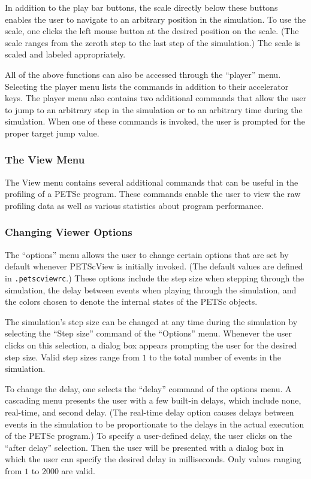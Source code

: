 {In addition to the play bar buttons, the scale directly below these
buttons enables the user to navigate to an arbitrary position in the
simulation.  To use the scale, one clicks the left mouse button at
the desired position on the scale.  (The scale ranges from the zeroth
step to the last step of the simulation.)  The scale is scaled and
labeled appropriately.

All of the above functions can also be accessed through the ``player''
menu.  Selecting the player menu lists the commands in addition to
their accelerator keys.  The player menu also contains two additional
commands that allow the user to jump to an arbitrary step in the
simulation or to an arbitrary time during the simulation.  When one of
these commands is invoked, the user is prompted for the proper target
jump value.

\subsubsection{The View Menu}

The View menu contains several additional commands that can be useful
in the profiling of a PETSc program.  These commands enable the user
to view the raw profiling data as well as various statistics about
program performance.

\subsubsection{Changing Viewer Options}

The ``options'' menu allows the user to change certain options that
are set by default whenever PETScView is initially invoked.
(The default values are defined in {\tt .petscviewrc}.) These options
include the step size when stepping through the simulation, the delay
between events when playing through the simulation, and the colors
chosen to denote the internal states of the PETSc objects.

The simulation's step size can be changed at any time during the
simulation by selecting the ``Step size'' command of the ``Options''
menu.  Whenever the user clicks on this selection, a dialog box
appears prompting the user for the desired step size.  Valid step
sizes range from $1$ to the total number of events in the simulation.

To change the delay, one selects the ``delay'' command of the options
menu.  A cascading menu presents the user with a few built-in delays,
which include none, real-time, and second delay.  (The real-time
delay option causes delays between events in the simulation to be
proportionate to the delays in the actual execution of the PETSc
program.)  To specify a user-defined delay, the user clicks on
the ``after delay'' selection.  Then the user will be
presented with a dialog box in which the user can specify the desired
delay in milliseconds.  Only values ranging from $1$ to $2000$ are
valid.

}
